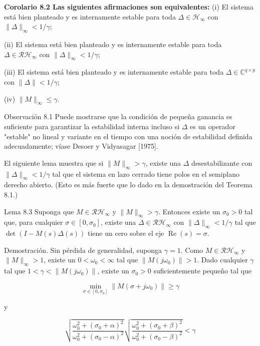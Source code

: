 \textbf{Corolario 8.2 Las siguientes afirmaciones son equivalentes:}
(i) El sistema está bien planteado y es internamente estable para toda $\Delta \in \mathcal{H}_{\infty}$ con $\|\Delta\|_{\infty}<1 / \gamma$;

(ii) El sistema está bien planteado y es internamente estable para toda $\Delta \in \mathcal{R} \mathcal{H}_{\infty}$ con $\|\Delta\|_{\infty}<1 / \gamma$;

(iii) El sistema está bien planteado y es internamente estable para toda $\Delta \in \mathbb{C}^{q \times p}$ con $\|\Delta\|<1 / \gamma$;

(iv) $\|M\|_{\infty} \leq \gamma$.

Observación 8.1 Puede mostrarse que la condición de pequeña ganancia es suficiente para garantizar la estabilidad interna incluso si $\Delta$ es un operador "estable" no lineal y variante en el tiempo con una noción de estabilidad definida adecuadamente; víase Desoer y Vidyasagar [1975].

El siguiente lema muestra que si $\|M\|_{\infty}>\gamma$, existe una $\Delta$ desestabilizante con $\|\Delta\|_{\infty}<1 / \gamma$ tal que el sistema en lazo cerrado tiene polos en el semiplano derecho abierto. (Esto es más fuerte que lo dado en la demostración del Teorema 8.1.)

Lema 8.3 Suponga que $M \in \mathcal{R} \mathcal{H}_{\infty}$ y $\|M\|_{\infty}>\gamma$. Entonces existe un $\sigma_{0}>0$ tal que, para cualquier $\sigma \in\left[0, \sigma_{0}\right]$, existe una $\Delta \in \mathcal{R} \mathcal{H}_{\infty}$ con $\|\Delta\|_{\infty}<1 / \gamma$ tal que $\operatorname{det}(I-M(s) \Delta(s))$ tiene un cero sobre el eje $\operatorname{Re}(s)=\sigma$.

Demostración. Sin pérdida de generalidad, suponga $\gamma=1$. Como $M \in \mathcal{R} \mathcal{H}_{\infty}$ y $\|M\|_{\infty}>1$, existe un $0<\omega_{0}<\infty$ tal que $\left\|M\left(j \omega_{0}\right)\right\|>1$. Dado cualquier $\gamma$ tal que $1<\gamma<\left\|M\left(j \omega_{0}\right)\right\|$, existe un $\sigma_{0}>0$ suficientemente pequeño tal que

$$
\min _{\sigma \in\left[0, \sigma_{0}\right]}\left\|M\left(\sigma+j \omega_{0}\right)\right\| \geq \gamma
$$

y

$$
\sqrt{\frac{\omega_{0}^{2}+\left(\sigma_{0}+\alpha\right)^{2}}{\omega_{0}^{2}+\left(\sigma_{0}-\alpha\right)^{2}}} \sqrt{\frac{\omega_{0}^{2}+\left(\sigma_{0}+\beta\right)^{2}}{\omega_{0}^{2}+\left(\sigma_{0}-\beta\right)^{2}}}<\gamma
$$

